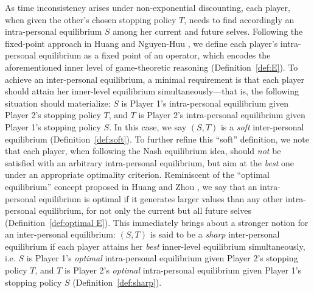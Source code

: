 \documentclass[11pt,reqno]{article}
\numberwithin{equation}{section}
\begin{document}
As time inconsistency arises under non-exponential discounting, each player, when given the other's chosen stopping policy $T$, needs to find accordingly an intra-personal equilibrium $S$ among her current and future selves. Following the fixed-point approach in Huang and Nguyen-Huu \cite{HN18}, we define each player's intra-personal equilibrium as a fixed point of an operator, which encodes the aforementioned  inner level of game-theoretic reasoning (Definition~\ref{def:E}). To achieve an inter-personal equilibrium, a minimal requirement is that each player should attain her inner-level equilibrium simultaneously---that is, the following situation should materialize: $S$ is Player 1's intra-personal equilibrium given Player 2's stopping policy $T$, and $T$ is Player 2's intra-personal equilibrium given Player 1's stopping policy $S$. In this case, we say $(S,T)$ is a {\it soft} inter-personal equilibrium (Definition~\ref{def:soft}). To further refine this ``soft'' definition, we note that each player, when following the Nash equilibrium idea, should {\it not} be satisfied with an arbitrary intra-personal equilibrium, but aim at the {\it best} one under an appropriate optimality criterion. Reminiscent of the ``optimal equilibrium'' concept proposed in Huang and Zhou \cite{HZ19, HZ20}, we say that an intra-personal equilibrium is optimal if it generates larger values than any other intra-personal equilibrium, for not only the current but all future selves (Definition~\ref{def:optimal E}). 
This immediately brings about a stronger notion for an inter-personal equilibrium: $(S,T)$ is said to be a {\it sharp} inter-personal equilibrium if each player attains her {\it best} inner-level equilibrium simultaneously, i.e. $S$ is Player 1's {\it optimal} intra-personal equilibrium given Player 2's stopping policy $T$, and $T$ is Player 2's {\it optimal} intra-personal equilibrium given Player 1's stopping policy $S$ (Definition~\ref{def:sharp}).
\end{document}
